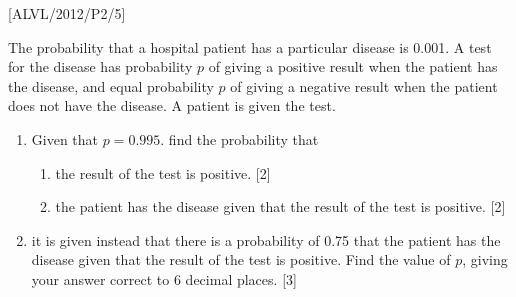 \item {[}ALVL/2012/P2/5{]}

The probability that a hospital patient has a particular disease is
0.001. A test for the disease has probability $p$ of giving a positive
result when the patient has the disease, and equal probability $p$
of giving a negative result when the patient does not have the disease.
A patient is given the test.
\begin{enumerate}
\item Given that $p=0.995$. find the probability that 
\begin{enumerate}
\item the result of the test is positive. {[}2{]} 
\item the patient has the disease given that the result of the test is positive.
{[}2{]}
\end{enumerate}
\item it is given instead that there is a probability of 0.75 that the patient
has the disease given that the result of the test is positive. Find
the value of $p$, giving your answer correct to 6 decimal places.
{[}3{]}
\end{enumerate}
